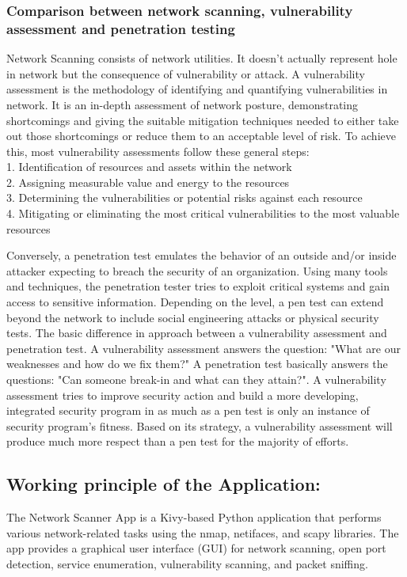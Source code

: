 \documentclass[conference]{IEEEtran}
\begin{document}
\subsubsection{Comparison between network scanning, vulnerability assessment and penetration testing}

Network Scanning consists of network utilities. It doesn't actually represent hole in network but the consequence of vulnerability or attack. A vulnerability assessment is the methodology of identifying and quantifying vulnerabilities in network. It is an in-depth assessment of network posture, demonstrating shortcomings and giving the suitable mitigation techniques needed to either take out those shortcomings
or reduce them to an acceptable level of risk. To achieve this, most vulnerability assessments follow these general steps:
\\1. Identification of resources and assets within the network
\\2. Assigning measurable value and energy to the resources
\\3. Determining the vulnerabilities or potential risks against each resource
\\4. Mitigating or eliminating the most critical vulnerabilities to the most valuable resources

Conversely, a penetration test emulates the behavior of an outside and/or inside attacker expecting to breach the security of an organization. Using many tools and techniques, the penetration tester tries to exploit critical systems and gain access to sensitive information. Depending on the level, a pen test can extend beyond the network to include social engineering attacks or physical security tests.
The basic difference in approach between a vulnerability assessment and penetration test. A vulnerability assessment answers the question: "What are our weaknesses and how do we fix them?" A penetration test basically answers the questions: "Can someone break-in and what can they attain?".
A vulnerability assessment tries to improve security action and build a more developing, integrated security program in as much as a pen test is only an instance of security program's fitness. Based on its strategy, a vulnerability assessment will produce much more respect than a pen test for the majority of efforts.

\subsection{Working principle of the Application:}
The Network Scanner App is a Kivy-based Python application that performs various network-related tasks using the nmap, netifaces, and scapy libraries. The app provides a graphical user interface (GUI) for network scanning, open port detection, service enumeration, vulnerability scanning, and packet sniffing.
\end{document}
